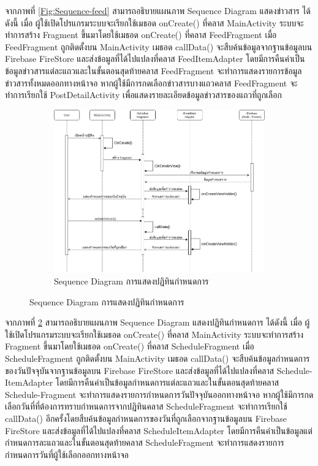 	จากภาพที่ \ref{Fig:Sequence-feed} สามารถอธิบายแผนภาพ Sequence Diagram แสดงข่าวสาร ได้ดังนี้ เมื่อ
	ผู้ใช้เปิดโปรแกรมระบบจะเรียกใช้เมธอด onCreate() ที่คลาส MainActivity ระบบจะทำการสร้าง
	Fragment ขึ้นมาโดยใช้เมธอด onCreate() ที่คลาส FeedFragment เมื่อ FeedFragment ถูกติดตั้งบน MainActivity เมธอด callData() จะสืบค้นข้อมูลจากฐานข้อมูลบน Firebase FireStore และส่งข้อมูลที่ได้ไปแปลงที่คลาส FeedItemAdapter โดยมีการคืนค่าเป็นข้อมูลข่าวสารแต่ละแถวและในขั้นตอนสุดท้ายคลาส FeedFragment จะทำการแสดงรายการข้อมูลข่าวสารทั้งหมดออกทางหน้าจอ หากผู้ใช้มีการกดเลือกข่าวสารบางแถวคลาส FeedFragment จะทำการเรียกใช้ PostDetailActivity เพื่อแสดงรายละเอียดข้อมูลข่าวสารของแถวที่ถูกเลือก
	\begin{figure}
	\begin{figure}[H]
		\centering
		\includegraphics[width=0.8\columnwidth]
		{Figures/3/Sequence/calendar}
		\caption{Sequence Diagram การแสดงปฏิทินกำหนดการ}
		\label{Fig:Sequence-calendar}
	\end{figure}
	\end{figure}
	\newpage
	จากภาพที่ \ref{Fig:Sequence-calendar} สามารถอธิบายแผนภาพ Sequence Diagram แสดงปฏิทินกำหนดการ ได้ดังนี้ เมื่อ
	ผู้ใช้เปิดโปรแกรมระบบจะเรียกใช้เมธอด onCreate() ที่คลาส MainActivity ระบบจะทำการสร้าง
	Fragment ขึ้นมาโดยใช้เมธอด onCreate() ที่คลาส ScheduleFragment เมื่อ ScheduleFragment ถูกติดตั้งบน MainActivity เมธอด callData() จะสืบค้นข้อมูลกำหนดการของวันปัจจุบันจากฐานข้อมูลบน Firebase FireStore และส่งข้อมูลที่ได้ไปแปลงที่คลาส Schedule-ItemAdapter โดยมีการคืนค่าเป็นข้อมูลกำหนดการแต่ละแถวและในขั้นตอนสุดท้ายคลาส Schedule-Fragment จะทำการแสดงรายการกำหนดการวันปัจจุบันออกทางหน้าจอ หากผู้ใช้มีการกดเลือกวันที่ที่ต้องการทราบกำหนดการจากปฏิทินคลาส ScheduleFragment จะทำการเรียกใช้ callData() อีกครั้งโดยสืบค้นข้อมูลกำหนดการของวันที่ถูกเลือกจากฐานข้อมูลบน Firebase FireStore และส่งข้อมูลที่ได้ไปแปลงที่คลาส ScheduleItemAdapter โดยมีการคืนค่าเป็นข้อมูลแต่กำหนดการละแถวและในขั้นตอนสุดท้ายคลาส ScheduleFragment จะทำการแสดงรายการกำหนดการวันที่ผู้ใช้เลือกออกทางหน้าจอ

